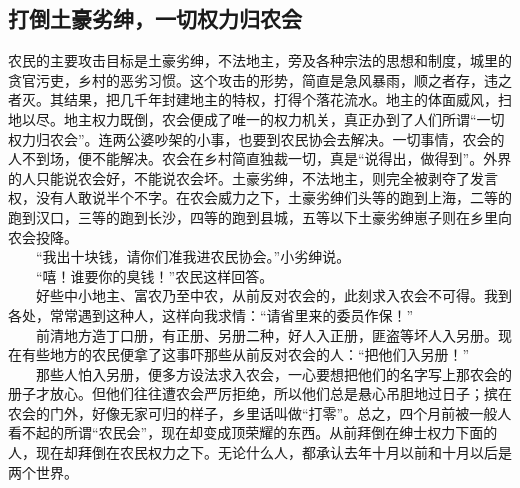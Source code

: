 \documentclass[cn,11pt,chinese]{elegantbook}
\def\myformat#1{\hfil\hfil #1}
\begin{document}
\subsection*{\myformat{打倒土豪劣绅，一切权力归农会}}
农民的主要攻击目标是土豪劣绅，不法地主，旁及各种宗法的思想和制度，城里的贪官污吏，乡村的恶劣习惯。这个攻击的形势，简直是急风暴雨，顺之者存，违之者灭。其结果，把几千年封建地主的特权，打得个落花流水。地主的体面威风，扫地以尽。地主权力既倒，农会便成了唯一的权力机关，真正办到了人们所谓“一切权力归农会”。连两公婆吵架的小事，也要到农民协会去解决。一切事情，农会的人不到场，便不能解决。农会在乡村简直独裁一切，真是“说得出，做得到”。外界的人只能说农会好，不能说农会坏。土豪劣绅，不法地主，则完全被剥夺了发言权，没有人敢说半个不字。在农会威力之下，土豪劣绅们头等的跑到上海，二等的跑到汉口，三等的跑到长沙，四等的跑到县城，五等以下土豪劣绅崽子则在乡里向农会投降。\\
　　“我出十块钱，请你们准我进农民协会。”小劣绅说。\\
　　“嘻！谁要你的臭钱！”农民这样回答。\\
　　好些中小地主、富农乃至中农，从前反对农会的，此刻求入农会不可得。我到各处，常常遇到这种人，这样向我求情：“请省里来的委员作保！”\\
　　前清地方造丁口册，有正册、另册二种，好人入正册，匪盗等坏人入另册。现在有些地方的农民便拿了这事吓那些从前反对农会的人：“把他们入另册！”\\
　　那些人怕入另册，便多方设法求入农会，一心要想把他们的名字写上那农会的册子才放心。但他们往往遭农会严厉拒绝，所以他们总是悬心吊胆地过日子；摈在农会的门外，好像无家可归的样子，乡里话叫做“打零”。总之，四个月前被一般人看不起的所谓“农民会”，现在却变成顶荣耀的东西。从前拜倒在绅士权力下面的人，现在却拜倒在农民权力之下。无论什么人，都承认去年十月以前和十月以后是两个世界。\\
\end{document}
